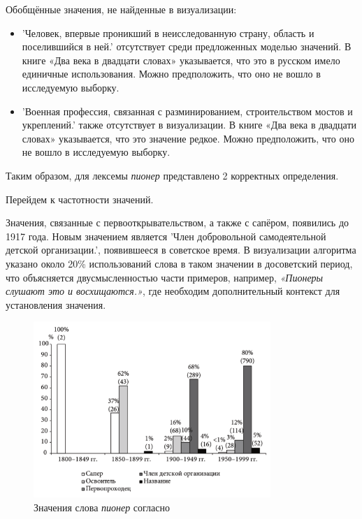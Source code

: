 Обобщённые значения, не найденные в визуализации:
\begin{itemize}
    \item ’Человек, впервые проникший в неисследованную страну, область и поселившийся в ней.’
отсутствует среди предложенных моделью значений.
В книге «Два века в двадцати словах» указывается, что это в русском имело единичные использования.
Можно предположить, что оно не вошло в исследуемую выборку.

    \item ’Военная профессия, связанная с разминированием, строительством мостов и укреплений.’ также отсутствует в визуализации.
В книге «Два века в двадцати словах» указывается, что это значение редкое.
Можно предположить, что оно не вошло в исследуемую выборку.
\end{itemize}

Таким образом, для лексемы \textit{пионер} представлено 2 корректных определения.

Перейдем к частотности значений.

Значения, связанные с первооткрывательством, а также с сапёром, появились до 1917 года.
Новым значением является ’Член добровольной самодеятельной детской организации.’,
появившееся в советское время.
В визуализации алгоритма указано около 20\% использований слова в таком значении
в досоветский период, что объясняется двусмысленностью части примеров,
например, \textit{«Пионеры слушают это и восхищаются.»}, где необходим дополнительный контекст
для установления значения.

\begin{figure}[H]
    \centering %
    \includegraphics[width=0.8\textwidth]{img/book/pioner/all}
    \caption{Значения слова \textit{пионер} согласно~\cite{TwoCenturies}}
\end{figure}

